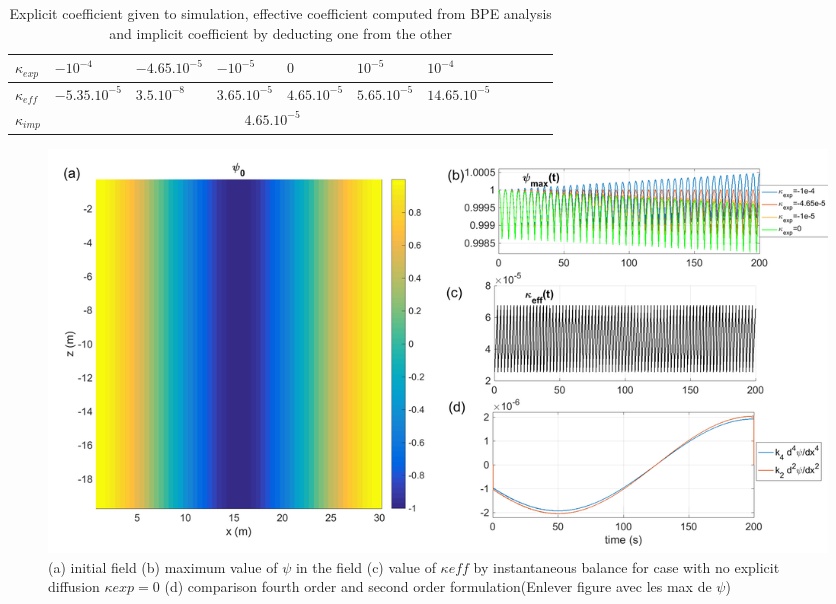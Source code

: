 \begin{table}[h!]
\centering
\begin{tabular}{|l|l|l|l|l|l|l|l|l|l|l|}
\hline
$\kappa_{exp}$ & $-10^{-4}$ &$-4.65.10^{-5}$ & $-10^{-5}$& $0$& $10^{-5}$& $10^{-4}$\\
\hline
$\kappa_{eff}$ & $-5.35.10^{-5}$ &$3.5.10^{-8}$ & $3.65.10^{-5}$& $4.65.10^{-5}$& $5.65.10^{-5}$& $14.65.10^{-5}$\\
\hline
$\kappa_{imp}$&\multicolumn{6}{c|}{$4.65.10^{-5}$}\\
\hline
\end{tabular}
\caption{Explicit coefficient given to simulation, effective coefficient computed from BPE analysis and implicit coefficient by deducting one from the other}
\end{table}

\begin{figure}[h!]
\centering
\includegraphics[width=1\textwidth]{./CHAP_BPE/AGBPE_numlab5.png}
\caption{(a) initial field  (b) maximum value of $\psi$ in the field  (c) value of $\kappa{eff}$ by instantaneous balance for case with no explicit diffusion $\kappa{exp}=0$ (d) comparison fourth order and second order formulation\color{red}(Enlever figure avec les max de $\psi$)\color{black}}
\label{fig5numlab}
\end{figure}


